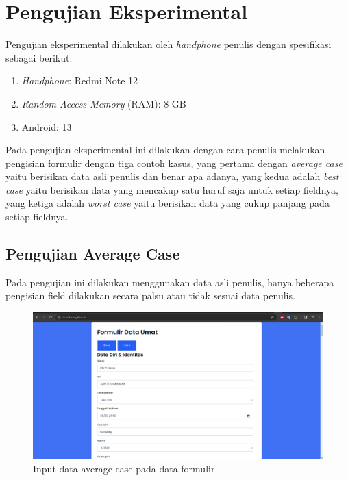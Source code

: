 \section{Pengujian Eksperimental}
\label{sec:pengujianEksperimental}

Pengujian eksperimental dilakukan oleh \textit{handphone} penulis dengan spesifikasi sebagai berikut:

\begin{enumerate}
	\item \textit{Handphone}: Redmi Note 12
	\item \textit{Random Access Memory} (RAM): 8 GB
	\item Android: 13
\end{enumerate}

Pada pengujian eksperimental ini dilakukan dengan cara penulis melakukan pengisian formulir dengan tiga contoh kasus, yang pertama dengan \textit{average case} yaitu berisikan data asli penulis dan benar apa adanya, yang kedua adalah \textit{best case} yaitu berisikan data yang mencakup satu huruf saja untuk setiap fieldnya, yang ketiga adalah \textit{worst case} yaitu berisikan data yang cukup panjang pada setiap fieldnya. 

\subsection{Pengujian Average Case}
\label{sec:pengujianAverage}

Pada pengujian ini dilakukan menggunakan data asli penulis, hanya beberapa pengisian field dilakukan secara palsu atau tidak sesuai data penulis.


\begin{figure}[H]
	\centering
	\includegraphics[scale=0.4]{Gambar/inputAverageCase.png}
	\caption{Input data average case pada data formulir} 
	\label{fig:inputAverageCase}
\end{figure}

